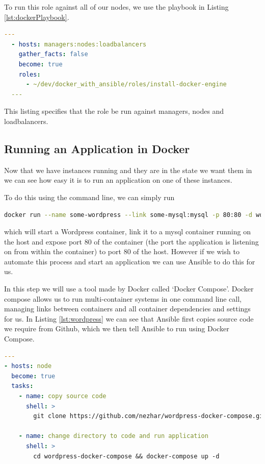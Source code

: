 \documentclass{article}
\begin{document}
To run this role against all of our nodes, we use the playbook in Listing \ref{lst:dockerPlaybook}.

\begin{lstlisting}[float,floatplacement=!htbp,language=yaml,caption={install-docker-engine.yml},label={lst:dockerPlaybook},basicstyle=\scriptsize]
  ---
  - hosts: managers:nodes:loadbalancers
    gather_facts: false
    become: true
    roles:
      - ~/dev/docker_with_ansible/roles/install-docker-engine
  ---
\end{lstlisting}

This listing specifies that the role be run against managers, nodes and loadbalancers.


\newpage
\subsection{Running an Application in Docker}
\label{subs:running_in_docker}
Now that we have instances running and they are in the state we want them in we can see how easy it is to run an application on one of these instances.

To do this using the command line, we can simply run 

\begin{lstlisting}[language=bash]
  docker run --name some-wordpress --link some-mysql:mysql -p 80:80 -d wordpress
\end{lstlisting}

which will start a Wordpress container, link it to a mysql container running on the host and expose port 80 of the container (the port the application is listening on from within the container) to port 80 of the host. However if we wish to automate this process and start an application we can use Ansible to do this for us.

In this step we will use a tool made by Docker called `Docker Compose'. Docker compose allows us to run multi-container systems in one command line call, managing links between containers and all container dependencies and settings for us. In Listing \ref{lst:wordpress} we can see that Ansible first copies source code we require from Github, which we then tell Ansible to run using Docker Compose. 

\begin{lstlisting}[float,floatplacement=!htbp,language=yaml,caption={run-wordpress.yml},label={lst:wordpress},basicstyle=\scriptsize]
---
- hosts: node
  become: true
  tasks:
    - name: copy source code
      shell: >
        git clone https://github.com/nezhar/wordpress-docker-compose.git
    
    - name: change directory to code and run application
      shell: >
        cd wordpress-docker-compose && docker-compose up -d
\end{lstlisting}
\end{document}
